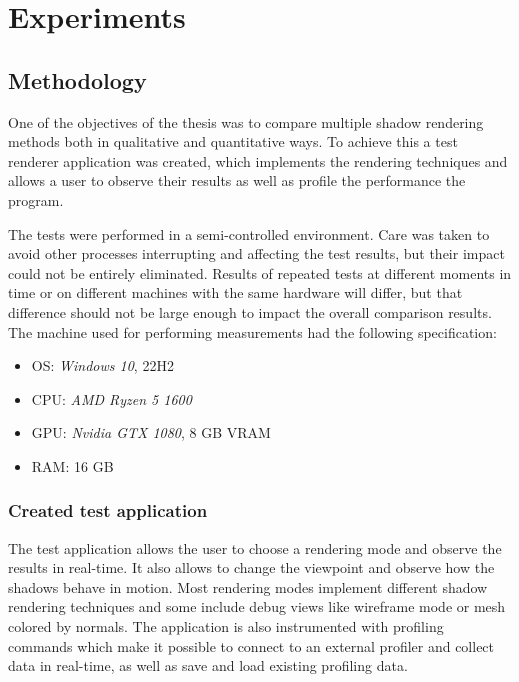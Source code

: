 \chapter{Experiments}
\label{section:chapter_4}

\section{Methodology}
One of the objectives of the thesis was to compare multiple shadow rendering methods both in qualitative and quantitative ways. To achieve this a test renderer application was created, which implements the rendering techniques and allows a user to observe their results as well as profile the performance the program.

The tests were performed in a semi-controlled environment. Care was taken to avoid other processes interrupting and affecting the test results, but their impact could not be entirely eliminated. Results of repeated tests at different moments in time or on different machines with the same hardware will differ, but that difference should not be large enough to impact the overall comparison results. 
The machine used for performing measurements had the following specification:
\begin{itemize}
    \item OS: \textit{Windows 10}, 22H2
    \item CPU: \textit{AMD Ryzen 5 1600}
    \item GPU: \textit{Nvidia GTX 1080}, 8 GB VRAM
    \item RAM: 16 GB
\end{itemize}

\subsection{Created test application}
The test application allows the user to choose a rendering mode and observe the results in real-time. It also allows to change the viewpoint and observe how the shadows behave in motion. Most rendering modes implement different shadow rendering techniques and some include debug views like wireframe mode or mesh colored by normals. The application is also instrumented with profiling commands which make it possible to connect to an external profiler and collect data in real-time, as well as save and load existing profiling data.

